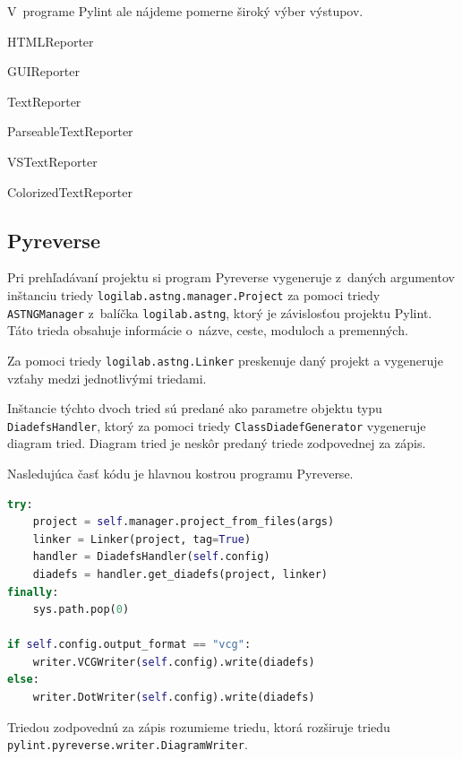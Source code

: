 \documentclass[11pt,oneside,final]{fithesis2}
\begin{document}
\begin{list}{•}{}
		V~programe Pylint ale nájdeme pomerne široký výber výstupov.
		
			    \begin{list}{•}{}
					\item HTMLReporter
					\item GUIReporter
					\item TextReporter
					\item ParseableTextReporter
					\item VSTextReporter
					\item ColorizedTextReporter
    			\end{list}
		
    \end{list}
		
	\subsection{Pyreverse}
	Pri prehľadávaní projektu si program Pyreverse vygeneruje z~daných argumentov inštanciu triedy \texttt{logilab.astng.manager.Project} za pomoci triedy \texttt{ASTNGManager} z~balíčka \texttt{logilab.astng}, ktorý je závislosťou projektu Pylint.
	Táto trieda obsahuje informácie o~názve, ceste, moduloch a premenných.
	
		Za pomoci triedy \texttt{logilab.astng.Linker} preskenuje daný projekt a vygeneruje vzťahy medzi jednotlivými triedami.
	
		Inštancie týchto dvoch tried sú predané ako parametre objektu typu \texttt{DiadefsHandler}, ktorý za pomoci triedy \texttt{ClassDiadefGenerator} vygeneruje diagram tried. Diagram tried je neskôr predaný triede zodpovednej za zápis.
		
		Nasledujúca časť kódu je hlavnou kostrou programu Pyreverse.
		
\begin{lstlisting}[language=python]	
try:
    project = self.manager.project_from_files(args)
    linker = Linker(project, tag=True)
    handler = DiadefsHandler(self.config)
    diadefs = handler.get_diadefs(project, linker)
finally:
    sys.path.pop(0)

if self.config.output_format == "vcg":
	writer.VCGWriter(self.config).write(diadefs)
else:
    writer.DotWriter(self.config).write(diadefs)
\end{lstlisting}
		
		
		Triedou zodpovednú za zápis rozumieme triedu, ktorá rozširuje triedu \texttt{pylint.pyreverse.writer.DiagramWriter}.
		
\end{document}
